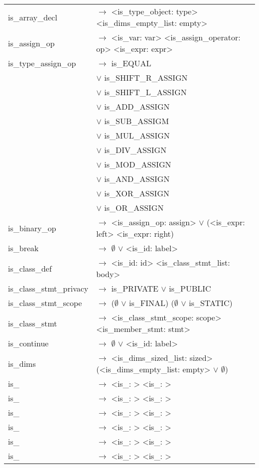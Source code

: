 \documentclass[a4paper]{article}
\begin{document}
\begin{tabular}{ll}
	is\_array\_decl 			& $\to$ <is\_type\_object: type> <is\_dims\_empty\_list: empty> \\
	is\_assign\_op				& $\to$ <is\_var: var> <is\_assign\_operator: op> <is\_expr: expr> \\
	is\_type_assign\_op			& $\to$ is\_EQUAL \\
								& $\vee$ is\_SHIFT\_R\_ASSIGN \\
								& $\vee$ is\_SHIFT\_L\_ASSIGN \\
								& $\vee$ is\_ADD\_ASSIGN \\
								& $\vee$ is\_SUB\_ASSIGM \\
								& $\vee$ is\_MUL\_ASSIGN \\
								& $\vee$ is\_DIV\_ASSIGN \\
								& $\vee$ is\_MOD\_ASSIGN \\
								& $\vee$ is\_AND\_ASSIGN \\
								& $\vee$ is\_XOR\_ASSIGN \\
								& $\vee$ is\_OR\_ASSIGN \\
	is\_binary\_op				& $\to$ <is\_assign\_op: assign> $\vee$ (<is\_expr: left> <is\_expr: right) \\
	is\_break 					& $\to$ $\emptyset$ $\vee$ <is\_id: label> \\
	is\_class\_def				& $\to$ <is\_id: id> <is\_class\_stmt\_list: body> \\
	is\_class\_stmt\_privacy	& $\to$ is\_PRIVATE $\vee$ is\_PUBLIC\\	
	is\_class\_stmt\_scope		& $\to$ ($\emptyset$ $\vee$ is\_FINAL) ($\emptyset$ $\vee$ is\_STATIC) \\
	is\_class\_stmt 			& $\to$ <is\_class\_stmt\_scope: scope> <is\_member\_stmt: stmt> \\
	is\_continue				& $\to$ $\emptyset$ $\vee$ <is\_id: label> \\
	is\_dims					& $\to$ <is\_dims\_sized\_list: sized> (<is\_dims\_empty\_list: empty> $\vee$ $\emptyset$) \\
	is\_ 						& $\to$ <is\_: > <is\_: > \\
	is\_ 						& $\to$ <is\_: > <is\_: > \\
	is\_ 						& $\to$ <is\_: > <is\_: > \\
	is\_ 						& $\to$ <is\_: > <is\_: > \\
	is\_ 						& $\to$ <is\_: > <is\_: > \\
	is\_ 						& $\to$ <is\_: > <is\_: > \\


\end{tabular}
\end{document}
